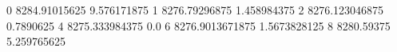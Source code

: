 0 8284.91015625 9.576171875
1 8276.79296875 1.458984375
2 8276.123046875 0.7890625
4 8275.333984375 0.0
6 8276.9013671875 1.5673828125
8 8280.59375 5.259765625
